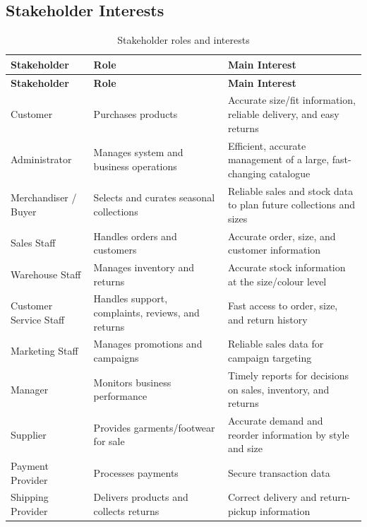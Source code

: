 \documentclass[11pt,a4paper,oneside]{extreport}
\begin{document}
\subsection{Stakeholder Interests}
\begin{xltabular}{\textwidth}{@{}L{3.3cm} L{4.2cm} Y@{}}
\caption{Stakeholder roles and interests}\label{tab:interests}\\
\toprule
\textbf{Stakeholder} & \textbf{Role} & \textbf{Main Interest} \\ \midrule
\endfirsthead
\toprule
\textbf{Stakeholder} & \textbf{Role} & \textbf{Main Interest} \\ \midrule
\endhead
\bottomrule
\endlastfoot
Customer & Purchases products & Accurate size/fit information, reliable delivery, and easy returns \\
Administrator & Manages system and business operations & Efficient, accurate management of a large, fast-changing catalogue \\
Merchandiser / Buyer & Selects and curates seasonal collections & Reliable sales and stock data to plan future collections and sizes \\
Sales Staff & Handles orders and customers & Accurate order, size, and customer information \\
Warehouse Staff & Manages inventory and returns & Accurate stock information at the size/colour level \\
Customer Service Staff & Handles support, complaints, reviews, and returns & Fast access to order, size, and return history \\
Marketing Staff & Manages promotions and campaigns & Reliable sales data for campaign targeting \\
Manager & Monitors business performance & Timely reports for decisions on sales, inventory, and returns \\
Supplier & Provides garments/footwear for sale & Accurate demand and reorder information by style and size \\
Payment Provider & Processes payments & Secure transaction data \\
Shipping Provider & Delivers products and collects returns & Correct delivery and return-pickup information \\
\end{xltabular}
\end{document}
